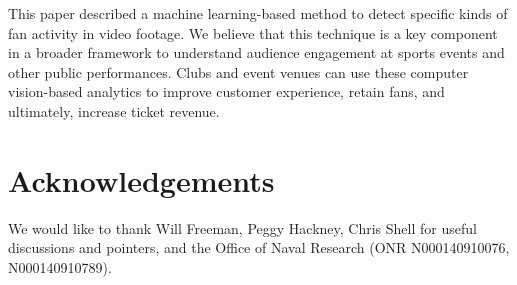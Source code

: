 \documentclass[times, 10pt,twocolumn]{article}
\begin{document}
This paper described a machine learning-based method to detect specific kinds of fan activity in video footage.  We believe that this technique is a key component in a broader framework to understand audience engagement at sports events and other public performances.  Clubs and event venues can use these computer vision-based analytics to improve customer experience, retain fans, and ultimately, increase ticket revenue.

\section{Acknowledgements}
We would like to thank Will Freeman, Peggy Hackney, Chris Shell for useful discussions and pointers, and the Office of Naval Research (ONR N000140910076, N000140910789).


{\tiny


}
\end{document}
